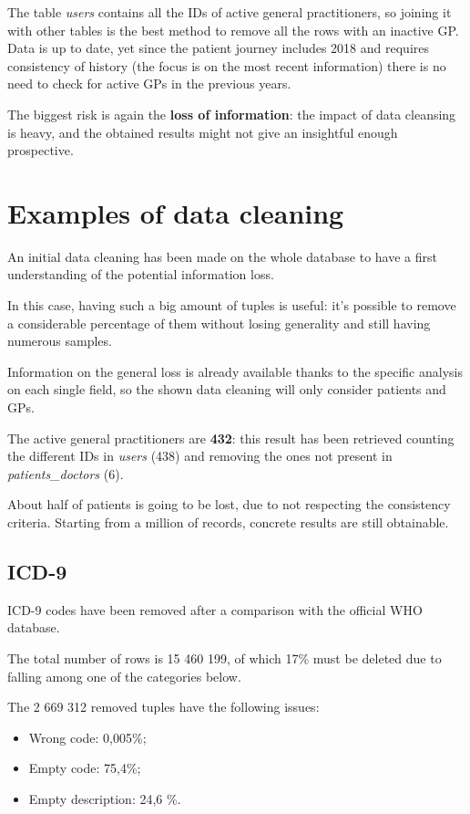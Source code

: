 The table \textit{users} contains all the IDs of active general practitioners, so joining it with other tables is the best method to remove all the rows with an inactive GP. Data is up to date, yet since the patient journey includes 2018 and requires consistency of history (the focus is on the most recent information) there is no need to check for active GPs in the previous years.

The biggest risk is again the \textbf{loss of information}: the impact of data cleansing is heavy, and the obtained results might not give an insightful enough prospective.

\section{Examples of data cleaning}
An initial data cleaning has been made on the whole database to have a first understanding of the potential information loss.

In this case, having such a big amount of tuples is useful: it's possible to remove a considerable percentage of them without losing generality and still having numerous samples.

Information on the general loss is already available thanks to the specific analysis on each single field, so the shown data cleaning will only consider patients and GPs.

The active general practitioners are \textbf{432}: this result has been retrieved counting the different IDs in \textit{users} (438) and removing the ones not present in \textit{patients\_doctors} (6).

About half of patients is going to be lost, due to not respecting the consistency criteria. Starting from a million of records, concrete results are still obtainable.

\subsection{ICD-9}
ICD-9 codes have been removed after a comparison with the official WHO database.

The total number of rows is 15 460 199, of which 17\% must be deleted due to falling among one of the categories below.

The 2 669 312 removed tuples have the following issues:
\begin{itemize}
	\item Wrong code: 0,005\%;
	\item Empty code: 75,4\%;
	\item Empty description: 24,6 \%.
\end{itemize}

